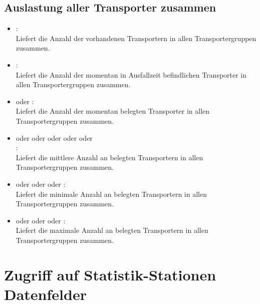 \subsection{Auslastung aller Transporter zusammen}

\begin{itemize}
  
\item
{}:\\
Liefert die Anzahl der vorhandenen Transportern in allen Transportergruppen zusammen.
  
\item
{}:\\
Liefert die Anzahl der momentan in Ausfallzeit befindlichen Transporter in allen Transportergruppen zusammen. 

\item
{} oder :\\
Liefert die Anzahl der momentan belegten Transporter in allen Transportergruppen zusammen.
  
\item
{} oder  oder  oder  oder  oder\\
:\\
Liefert die mittlere Anzahl an belegten Transportern in allen Transportergruppen zusammen.
  
\item
{} oder  oder  oder :\\
Liefert die minimale Anzahl an belegten Transportern in allen Transportergruppen zusammen.
  
\item
{} oder  oder  oder :\\
Liefert die maximale Anzahl an belegten Transportern in allen Transportergruppen zusammen.

\end{itemize}



\section{Zugriff auf Statistik-Stationen Datenfelder}

